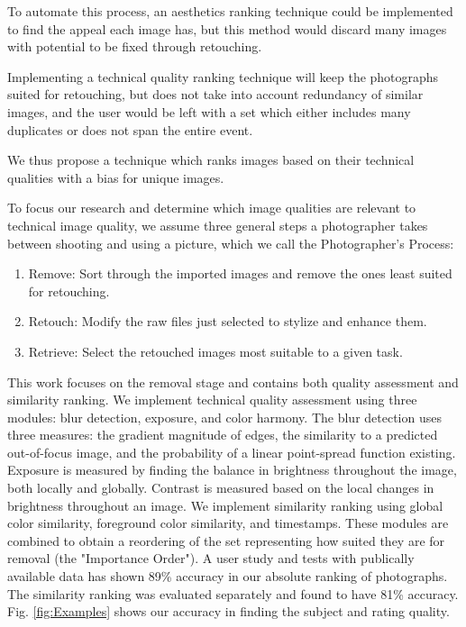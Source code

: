 \documentclass{article}
\begin{document}
To automate this process, an aesthetics ranking technique could be implemented to find the appeal each image has, but this method would discard many images with potential to be fixed through retouching.


Implementing a technical quality ranking technique will keep the photographs suited for retouching, but does not take into account redundancy of similar images, and the user would be left with a set which either includes many duplicates or does not span the entire event.


We thus propose a technique which ranks images based on their technical qualities with a bias for unique images.%

To focus our research and determine which image qualities are relevant to technical image quality, we assume three general steps a photographer takes between shooting and using a picture, which we call the Photographer's Process:
\begin{enumerate}
\item Remove: Sort through the imported images and remove the ones least suited for retouching.
\item Retouch: Modify the raw files just selected to stylize and enhance them.
\item Retrieve: Select the retouched images most suitable to a given task.
\end{enumerate}

This work focuses on the removal stage and contains both quality assessment and similarity ranking. We implement technical quality assessment using three modules: blur detection, exposure, and color harmony. The blur detection uses three measures: the gradient magnitude of edges, the similarity to a predicted out-of-focus image, and the probability of a linear point-spread function existing. Exposure is measured by finding the balance in brightness throughout the image, both locally and globally. Contrast is measured based on the local changes in brightness throughout an image. We implement similarity ranking using global color similarity, foreground color similarity, and timestamps.  These modules are combined to obtain a reordering of the set representing how suited they are for removal (the "Importance Order"). A user study and tests with publically available data has shown 89\% accuracy in our absolute ranking of photographs. The similarity ranking was evaluated separately and found to have 81\% accuracy. Fig. \ref{fig:Examples} shows our accuracy in finding the subject and rating quality.
\end{document}
